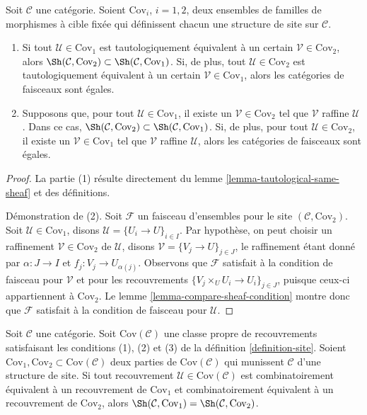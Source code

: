 \begin{lemma}
\label{lemma-refine-same-topology}
Soit $\mathcal{C}$ une catégorie. Soient $\text{Cov}_i$, $i = 1, 2$, deux
ensembles de familles de morphismes à cible fixée qui définissent chacun une
structure de site sur $\mathcal{C}$.
\begin{enumerate}
\item Si tout $\mathcal{U} \in \text{Cov}_1$ est tautologiquement équivalent
à un certain $\mathcal{V} \in \text{Cov}_2$, alors
$\Sh(\mathcal{C}, \text{Cov}_2) \subset
\Sh(\mathcal{C}, \text{Cov}_1)$.
Si, de plus, tout $\mathcal{U} \in \text{Cov}_2$ est tautologiquement
équivalent à un certain $\mathcal{V} \in \text{Cov}_1$, alors les catégories
de faisceaux sont égales.
\item Supposons que, pour tout $\mathcal{U} \in \text{Cov}_1$, il existe un
$\mathcal{V} \in \text{Cov}_2$ tel que $\mathcal{V}$ raffine $\mathcal{U}$.
Dans ce cas,
$\Sh(\mathcal{C}, \text{Cov}_2) \subset
\Sh(\mathcal{C}, \text{Cov}_1)$.
Si, de plus, pour tout $\mathcal{U} \in \text{Cov}_2$, il existe un
$\mathcal{V} \in \text{Cov}_1$ tel que $\mathcal{V}$ raffine $\mathcal{U}$,
alors les catégories de faisceaux sont égales.
\end{enumerate}
\end{lemma}

\begin{proof}
La partie (1) résulte directement du
lemme \ref{lemma-tautological-same-sheaf} et des définitions.

\medskip\noindent
Démonstration de (2). Soit $\mathcal{F}$ un faisceau d’ensembles pour le site
$(\mathcal{C}, \text{Cov}_2)$. Soit $\mathcal{U} \in \text{Cov}_1$, disons
$\mathcal{U} = \{U_i \to U\}_{i \in I}$. Par hypothèse, on peut choisir un
raffinement $\mathcal{V} \in \text{Cov}_2$ de $\mathcal{U}$, disons
$\mathcal{V} = \{V_j \to U\}_{j \in J}$, le raffinement étant donné par
$\alpha : J \to I$ et $f_j : V_j \to U_{\alpha(j)}$. Observons que
$\mathcal{F}$ satisfait à la condition de faisceau pour $\mathcal{V}$ et pour
les recouvrements $\{V_j \times_U U_i \to U_i\}_{j \in J}$, puisque ceux-ci
appartiennent à $\text{Cov}_2$. Le lemme
\ref{lemma-compare-sheaf-condition} montre donc que $\mathcal{F}$ satisfait à
la condition de faisceau pour $\mathcal{U}$.
\end{proof}

\begin{lemma}
\label{lemma-choice-set-coverings-immaterial}
Soit $\mathcal{C}$ une catégorie. Soit $\text{Cov}(\mathcal{C})$ une classe
propre de recouvrements satisfaisant les conditions (1), (2) et (3) de la
définition \ref{definition-site}. Soient
$\text{Cov}_1, \text{Cov}_2 \subset \text{Cov}(\mathcal{C})$ deux parties de
$\text{Cov}(\mathcal{C})$ qui munissent $\mathcal{C}$ d’une structure de site.
Si tout recouvrement $\mathcal{U} \in \text{Cov}(\mathcal{C})$ est
combinatoirement équivalent à un recouvrement de $\text{Cov}_1$ et
combinatoirement équivalent à un recouvrement de $\text{Cov}_2$, alors
$\Sh(\mathcal{C}, \text{Cov}_1) =
\Sh(\mathcal{C}, \text{Cov}_2)$.
\end{lemma}


